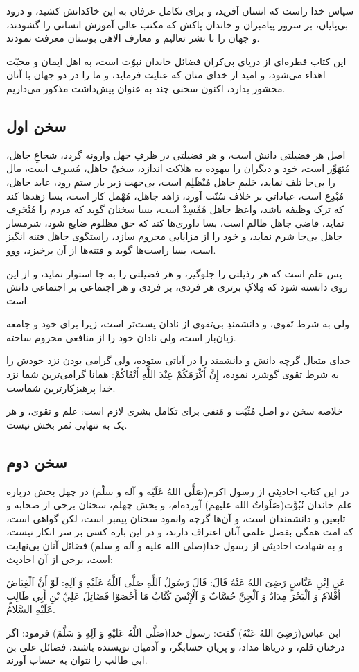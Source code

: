 سپاس خدا راست که انسان آفرید، و برای تکامل عرفان به این خاکدانش کشید،
و درود بی‌پایان، بر سرور پیامبران و خاندان پاکش که مکتب عالی آموزش
انسانی را گشودند، و جهان را با نشر تعالیم و معارف الاهی بوستان معرفت
نمودند.

این کتاب قطره‌ای از دریای بی‌کران فضائل خاندان نبوّت است، به اهل ایمان و
محبّت اهداء می‌شود، و امید از خدای منان که عنایت فرماید، و ما را در دو
جهان با آنان محشور بدارد، اکنون سخنی چند به عنوان پیش‌داشت مذکور
می‌داریم.

\subsection*{سخن اول}

اصل هر فضیلتی دانش است، و هر فضیلتی در ظرفِ جهل وارونه گردد، شجاعِ جاهل،
مُتَهَوِّر است، خود و دیگران را بیهوده به هلاکت اندازد، سخیِّ جاهل، مُسرِف است،
مال را بی‌جا تلف نماید، حَلیمِ جاهل مُنْظَلِم است، بی‌جهت زیر بار ستم رود،
عابد جاهل، مُبْدِع است، عباداتی بر خلاف سُنّت آورد، زاهد جاهل، مُهْمل کار
است، بسا زهدها کند که ترک وظیفه باشد، واعظ جاهل مُفْسِدْ است، بسا سخنان
گوید که مردم را مُنْحَرِف نماید، قاضی جاهل ظالم است، بسا داوری‌ها کند که حق
مظلوم ضایع شود، شرمسار جاهل بی‌جا شرم نماید، و خود را از مزایایی محروم
سازد، راستگوی جاهل فتنه انگیز است، بسا راست‌ها گوید و فتنه‌ها از آن
برخیزد، ووو.

پس علم است که هر رذیلتی را جلوگیر، و هر فضیلتی را به جا استوار نماید،
و از این روی دانسته شود که مِلاکِ برتری هر فردی، بر فردی و هر اجتماعی بر
اجتماعی دانش است.

ولی به شرط تَقوی، و دانشمندِ بی‌تقوی از نادان پست‌تر است، زیرا برای خود و
جامعه زیان‌‌بار است، ولی نادان خود را از منافعی محروم ساخته.

خدای متعال گرچه دانش و دانشمند را در آیاتی ستوده، ولی گرامی بودن نزد
خودش را به شرط تقوی گوشزد نموده، إِنَّ أَكْرَمَكُمْ عِنْدَ اللَّهِ أَتْقَاكُمْ: همانا
گرامی‌ترین شما نزد خدا پرهیزکارترین شماست.

خلاصه سخن دو اصل مُثْبَت و مَنفی برای تکامل بشری لازم است: علم و تقوی، و
هر یک به تنهایی ثمر بخش نیست.

\subsection*{سخن دوم}

در این کتاب احادیثی از رسول اکرم(صَلَّی اللهُ عَلَیْه و آله و سلّم) در چهل بخش
درباره علم خاندان نُبُوَّت(صَلَواتُ الله علیهم) آورده‌ام، و بخش چهلم، سخنان
برخی از صحابه و تابعین و دانشمندان است، و آن‌ها گرچه وانمود سخنان پیمبر
است، لکن گواهی است، که امت همگی بفضل علمی آنان اعتراف دارند، و در این
باره کسی بر سر انکار نیست، و به شهادت احادیثی از رسول خدا(صلی الله
علیه و آله و سلم) فضائل آنان بی‌نهایت است، برخی از آن احادیث:

عَنِ اِبْنِ عَبَّاسٍ رَضِیَ اللهُ عَنْهُ قَالَ: قَالَ رَسُولُ اَللَّهِ صَلَّى اَللَّهُ عَلَيْهِ وَ آلِهِ: لَوْ أَنَّ
اَلْغِيَاضَ أَقْلاَمٌ وَ اَلْبَحْرَ مِدَادٌ وَ اَلْجِنَّ حُسَّابٌ وَ اَلْإِنْسَ كُتَّابٌ مَا أَحْصَوْا فَضَائِلَ عَلِيِّ
بْنِ أَبِي طَالِبٍ عَلَیْهِ السَّلامُ.

ابن عباس(رَضِیَ اللهُ عَنْهُ) گفت: رسول خدا(صَلَّى اَللَّهُ عَلَيْهِ وَ آلِهِ وَ سَلَّمَ) فرمود:
اگر درختان قلم، و دریاها مداد، و پریان حسابگر، و آدمیان نویسنده باشند،
فضائل علی بن ابی طالب را نتوان به حساب آورند.
